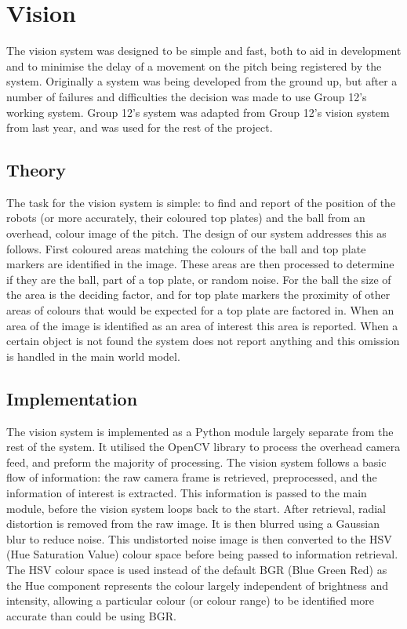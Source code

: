 
\section{Vision}

The vision system was designed to be simple and fast, both to aid in
development and to minimise the delay of a movement on the pitch being
registered by the system. Originally a system was being developed from the
ground up, but after a number of failures and difficulties the decision was
made to use Group 12's working system. Group 12's system was adapted from
Group 12's vision system from last year, and was used for the rest of the
project.

\subsection{Theory}

The task for the vision system is simple: to find and report of the position of
the robots (or more accurately, their coloured top plates) and the ball from an
overhead, colour image of the pitch. The design of our system addresses this as
follows. First coloured areas matching the colours of the ball and top plate
markers are identified in the image. These areas are then processed to
determine if they are the ball, part of a top plate, or random noise. For the
ball the size of the area is the deciding factor, and for top plate markers the
proximity of other areas of colours that would be expected for a top plate are
factored in. When an area of the image is identified as an area of interest
this area is reported. When a certain object is not found the system does not
report anything and this omission is handled in the main world model.

\subsection{Implementation}

The vision system is implemented as a Python module largely separate from the
rest of the system. It utilised the OpenCV library to process the overhead
camera feed, and preform the majority of processing. The vision system follows
a basic flow of information: the raw camera frame is retrieved, preprocessed,
and the information of interest is extracted. This information is passed to the
main module, before the vision system loops back to the start. After retrieval,
radial distortion is removed from the raw image. It is then blurred using a
Gaussian blur to reduce noise. This undistorted noise image is then converted
to the HSV (Hue Saturation Value) colour space before being passed to
information retrieval. The HSV colour space is used instead of the default BGR
(Blue Green Red) as the Hue component represents the colour largely independent
of brightness and intensity, allowing a particular colour (or colour range) to
be identified more accurate than could be using BGR.

